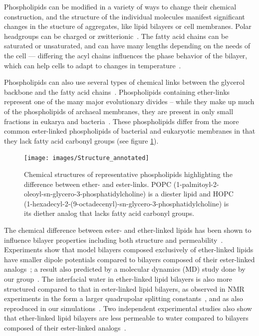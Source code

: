 \documentclass[12pt,openany,final]{book}
\begin{document}
Phospholipids can be modified in a variety of ways to change their chemical construction,
and the structure of the individual molecules manifest significant changes
in the stucture of aggregates, like lipid bilayers or cell membranes.
Polar headgroups can be charged or zwitterionic~\cite{israelachvili:2011:intermol}. The fatty acid chains can be saturated or unsaturated, 
and can have many lengths depending 
on the needs of the cell --- differing the acyl chains influences the 
phase behavior of the bilayer, which can help cells to adapt to changes in
temperature~\cite{ashrafuzzaman:2012:membrane,zhang:2008:memhomeo}.

Phospholipids can also use several types of chemical links between the glycerol
backbone and the fatty acid chains~\cite{sehgal:1962, koga:2014}.
Phospholipids containing ether-links represent one of the many major evolutionary divides -- 
while they make up much of the phospholipids of archaeal membranes,
 they are present in only small fractions in eukarya and bacteria~\cite{sehgal:1962, koga:2014, kates:1993:archealipids}. 
These phospholipids differ from the more common ester-linked phospholipids of bacterial and 
eukaryotic membranes in that they lack fatty acid carbonyl groups (see figure \ref{fig:struc}). 

\begin{figure}[p]
\caption[Chemical structures of representative phospholipids highlighting the difference
between ether- and ester-links.]{ 
Chemical structures of representative phospholipids highlighting the difference 
between ether- and ester-links. POPC (1-palmitoyl-2-oleoyl-sn-glycero-3-phosphatidylcholine) is a 
diester lipid and HOPC (1-hexadecyl-2-(9-octadecenyl)-sn-glycero-3-phosphatidylcholine) is its diether analog that lacks fatty acid carbonyl groups.
}
\label{fig:struc}
\texttt{[image: images/Structure\_annotated]}
\end{figure}

The chemical difference between ester- and ether-linked lipids has been shown to influence 
bilayer properties including both structure and permeability~\cite{guler:2009,jansen:1995, gawrisch:1992,haas:1990,fogarty:2015,kruczek:2017:ether}. 
Experiments show that model bilayers composed exclusively of ether-linked lipids have smaller dipole potentials compared to 
bilayers composed of their ester-linked analogs~\cite{gawrisch:1992}; a result also predicted by a molecular dynamics (MD) 
study done by our group~\cite{kruczek:2017:ether}. The interfacial water in ether-linked lipid bilayers is also more structured compared to that 
in ester-linked lipid bilayers, as observed in NMR experiments in the form a larger quadrupolar splitting constants~\cite{gawrisch:1992}, and as 
also reproduced in our simulations~\cite{kruczek:2017:ether}. Two independent experimental studies also show 
that ether-linked lipid bilayers are less permeable to water compared to bilayers composed of their ester-linked 
analogs~\cite{jansen:1995, guler:2009}. 
\end{document}
